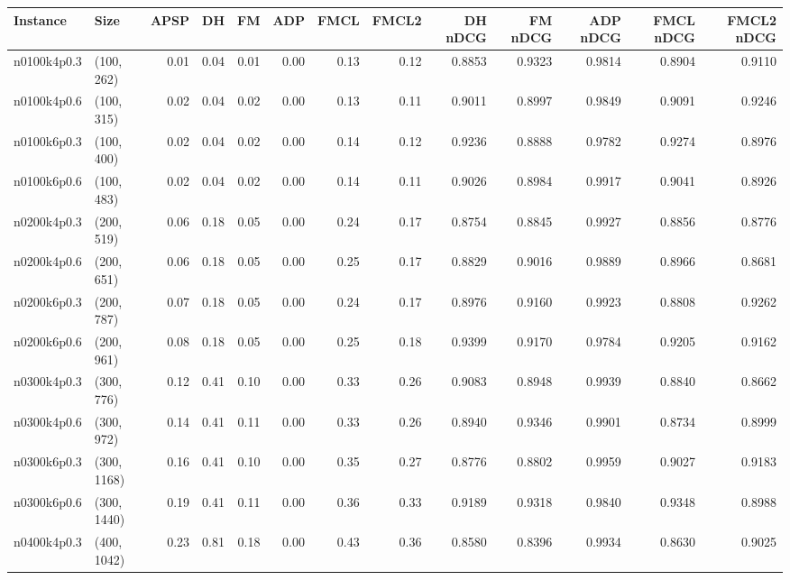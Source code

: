 \begin{tabular}{llrrrrrrrrrrr}
\toprule
   Instance &          Size &   APSP &     DH &    FM &  ADP &  FMCL &  FMCL2 &  DH nDCG &  FM nDCG &  ADP nDCG &  FMCL nDCG &  FMCL2 nDCG \\
\midrule
n0100k4p0.3 &    (100, 262) &   0.01 &   0.04 &  0.01 & 0.00 &  0.13 &   0.12 &   0.8853 &   0.9323 &    0.9814 &     0.8904 &      0.9110 \\
n0100k4p0.6 &    (100, 315) &   0.02 &   0.04 &  0.02 & 0.00 &  0.13 &   0.11 &   0.9011 &   0.8997 &    0.9849 &     0.9091 &      0.9246 \\
n0100k6p0.3 &    (100, 400) &   0.02 &   0.04 &  0.02 & 0.00 &  0.14 &   0.12 &   0.9236 &   0.8888 &    0.9782 &     0.9274 &      0.8976 \\
n0100k6p0.6 &    (100, 483) &   0.02 &   0.04 &  0.02 & 0.00 &  0.14 &   0.11 &   0.9026 &   0.8984 &    0.9917 &     0.9041 &      0.8926 \\
n0200k4p0.3 &    (200, 519) &   0.06 &   0.18 &  0.05 & 0.00 &  0.24 &   0.17 &   0.8754 &   0.8845 &    0.9927 &     0.8856 &      0.8776 \\
n0200k4p0.6 &    (200, 651) &   0.06 &   0.18 &  0.05 & 0.00 &  0.25 &   0.17 &   0.8829 &   0.9016 &    0.9889 &     0.8966 &      0.8681 \\
n0200k6p0.3 &    (200, 787) &   0.07 &   0.18 &  0.05 & 0.00 &  0.24 &   0.17 &   0.8976 &   0.9160 &    0.9923 &     0.8808 &      0.9262 \\
n0200k6p0.6 &    (200, 961) &   0.08 &   0.18 &  0.05 & 0.00 &  0.25 &   0.18 &   0.9399 &   0.9170 &    0.9784 &     0.9205 &      0.9162 \\
n0300k4p0.3 &    (300, 776) &   0.12 &   0.41 &  0.10 & 0.00 &  0.33 &   0.26 &   0.9083 &   0.8948 &    0.9939 &     0.8840 &      0.8662 \\
n0300k4p0.6 &    (300, 972) &   0.14 &   0.41 &  0.11 & 0.00 &  0.33 &   0.26 &   0.8940 &   0.9346 &    0.9901 &     0.8734 &      0.8999 \\
n0300k6p0.3 &   (300, 1168) &   0.16 &   0.41 &  0.10 & 0.00 &  0.35 &   0.27 &   0.8776 &   0.8802 &    0.9959 &     0.9027 &      0.9183 \\
n0300k6p0.6 &   (300, 1440) &   0.19 &   0.41 &  0.11 & 0.00 &  0.36 &   0.33 &   0.9189 &   0.9318 &    0.9840 &     0.9348 &      0.8988 \\
n0400k4p0.3 &   (400, 1042) &   0.23 &   0.81 &  0.18 & 0.00 &  0.43 &   0.36 &   0.8580 &   0.8396 &    0.9934 &     0.8630 &      0.9025 \\

\end{tabular}

